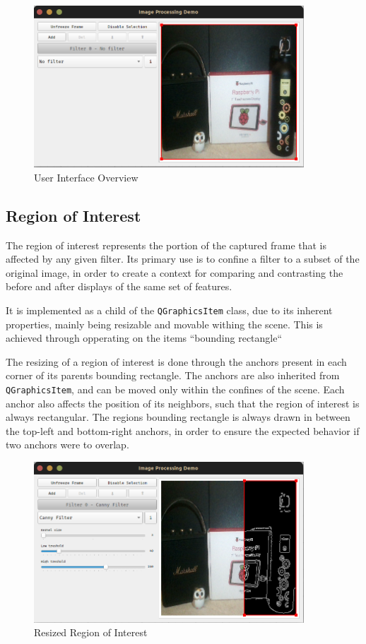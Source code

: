 \begin{figure}[H]
	\includegraphics[width=0.9\textwidth, height=0.45\textwidth]{resources/Empty_1.png}
	\caption{User Interface Overview}
\end{figure}

\subsection{Region of Interest}

The region of interest represents the portion of the captured frame that is affected by any given filter. Its
primary use is to confine a filter to a subset of the original image, in order to create a context for
comparing and contrasting the before and after displays of the same set of features.

It is implemented as a child of the \verb|QGraphicsItem| class, due to its inherent properties, mainly being
resizable and movable withing the scene. This is achieved through opperating on the items ``bounding rectangle``
\cite{qtDoc}

The resizing of a region of interest is done through the anchors present in each corner of its parents
bounding rectangle. The anchors are also inherited from \verb|QGraphicsItem|, and can be moved only within
the confines of the scene. Each anchor also affects the position of its neighbors, such that the region of
interest is always rectangular. The regions bounding rectangle is always drawn in between the top-left and
bottom-right anchors, in order to ensure the expected behavior if two anchors were to overlap.

\begin{figure}[H]
	\includegraphics[width=0.9\textwidth, height=0.45\textwidth]{resources/Roi_1.png}
	\caption{Resized Region of Interest}
\end{figure}

